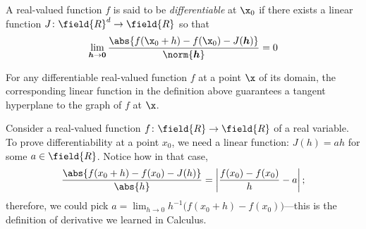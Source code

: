 

A real-valued function $f$ is said to be \emph{differentiable} at $\x_0$ if there exists a linear function $J\colon \field{R}^d \to \field{R}$ so that 
\begin{equation*}
\lim_{\boldsymbol{h} \to \boldsymbol{0}} \frac{\abs{f(\x_0+h)-f(\x_0)-J(\boldsymbol{h})}}{\norm{\boldsymbol{h}}} = 0
\end{equation*}

For any differentiable real-valued function $f$ at a point $\x$ of its domain, the corresponding linear function in the definition above guarantees a tangent hyperplane to the graph of $f$ at $\x$.  
 
\begin{example}\label{example:derivatives}
Consider a real-valued function $f\colon \field{R} \to \field{R}$ of a real variable. To prove differentiability at a point $x_0$, we need a linear function: $J(h)=ah$ for some $a\in \field{R}$. Notice how in that case, 
\begin{equation*}
\frac{\abs{f(x_0+h)-f(x_0)-J(h)}}{\abs{h}} = \left\lvert \frac{f(x_0)-f(x_0)}{h} - a \right\lvert;
\end{equation*}
therefore, we could pick $a = \lim_{h\to 0} h^{-1}\big( f(x_0+h) - f(x_0) \big)$---this is the definition of derivative we learned in Calculus.
\end{example}

